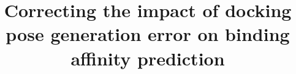 \documentclass[twocolumn]{bmcart}
\begin{document}
\begin{frontmatter}

\begin{fmbox}


\title{Correcting the impact of docking pose generation error on binding affinity prediction}


\author[
   addressref={aff1},                   %
   email={jackyleehongjian@gmail.com}   %
]{ }
\author[
   addressref={aff1},                   %
   email={ksleung@cse.cuhk.edu.hk}
]{ }
\author[
   addressref={aff1},                   %
   email={mhwong@cse.cuhk.edu.hk}
]{ }
\author[
   addressref={aff2,aff3,aff4,aff5},
   corref={aff2,aff3,aff4,aff5},                      %
   email={email: pedro.ballester@inserm.fr; tel.: +33-486-977-265; fax: +33-486-977-499}
]{ }



\end{fmbox}
\end{frontmatter}
\end{document}
